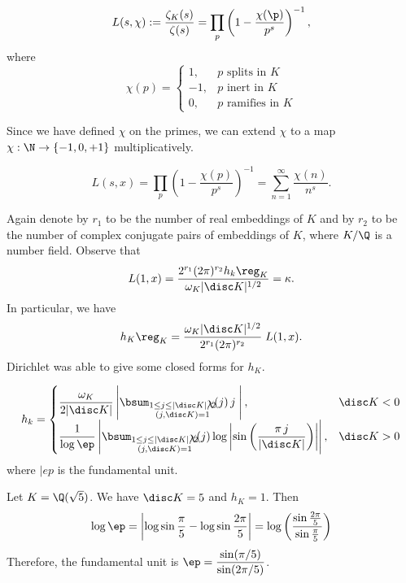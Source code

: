 \begin{dfn}
	\[
	L(s,\chi):= \dfrac{\zeta_K(s)}{\zeta(s)}= \prod_p \left( 1 - \dfrac{\chi(\p)}{p^s} \right)^{-1},
	\]
where 
	\[
	\chi(p)=
	\begin{cases}
	1, & p \text{ splits in }K \\
	-1, & p \text{ inert in }K \\
	0, & p \text{ ramifies in }K
	\end{cases}
	\]
\end{dfn}

Since we have defined $\chi$ on the primes, we can extend $\chi$ to a map $\chi: \N \to \{-1,0,+1\}$ multiplicatively.

\begin{dfn}[$L$-series]
	\[
	L(s,x)= \prod_p \left(1 - \dfrac{\chi(p)}{p^s}\right)^{-1}= \sum_{n=1}^\infty \dfrac{\chi(n)}{n^s}. 
	\]
\end{dfn}

Again denote by $r_1$ to be the number of real embeddings of $K$ and by $r_2$ to be the number of complex conjugate pairs of embeddings of $K$, where $K/\Q$ is a number field. Observe that
	\[
	L(1,x)= \dfrac{2^{r_1} (2\pi)^{r_2} h_k \reg_K}{\omega_K |\disc K|^{1/2}} = \kappa.
	\]
In particular, we have
	\[
	h_K \reg_K = \dfrac{\omega_K |\disc K|^{1/2}}{2^{r_1} (2\pi)^{r_2}} \; L(1,x).
	\]
Dirichlet was able to give some closed forms for $h_K$.

\begin{thm}[Dirchlet] 
	\[
	h_k=
	\begin{cases}
	\dfrac{\omega_K}{2|\disc K|} \left| \displaystyle\bsum_{\substack{1 \leq j \leq |\disc K|/2 \\ (j,\disc K)=1}} \!\!\!\!\!\chi(j)\, j \;\right|, & \disc K<0 \\
	\dfrac{1}{\log \ep} \left| \displaystyle\bsum_{\substack{1 \leq j \leq |\disc K|/2 \\ (j,\disc K)=1}} \!\!\!\!\!\chi(j) \log \left| \sin\left( \dfrac{\pi \,j}{|\disc K|} \right) \right| \right|, & \disc K>0
	\end{cases}
	\]
where $|ep$ is the fundamental unit.
\end{thm}


\begin{ex}
Let $K=\Q(\sqrt{5})$. We have $\disc K=5$ and $h_K=1$. Then
	\[
	\log \ep= \left|\log\sin \frac{\pi}{5} - \log \sin \frac{2\pi}{5} \right| = \log\left(\dfrac{\sin \frac{2\pi}{5}}{\sin \frac{\pi}{5}} \right)
	\]
Therefore, the fundamental unit is $\ep= \dfrac{\sin(\pi/5)}{\sin(2\pi/5)}$. \xqed
\end{ex}

